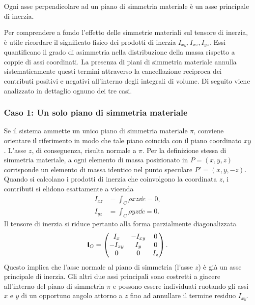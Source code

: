 \begin{proposition}
    Ogni asse perpendicolare ad un piano di simmetria materiale è un asse principale di inerzia.
\end{proposition}

Per comprendere a fondo l'effetto delle simmetrie materiali sul tensore di inerzia, è utile ricordare il significato fisico dei prodotti di inerzia $I_{xy}, I_{xz}, I_{yz}$. Essi quantificano il grado di asimmetria nella distribuzione della massa rispetto a coppie di assi coordinati. La presenza di piani di simmetria materiale annulla sistematicamente questi termini attraverso la cancellazione reciproca dei contributi positivi e negativi all'interno degli integrali di volume. Di seguito viene analizzato in dettaglio ognuno dei tre casi.

\subsubsection*{Caso 1: Un solo piano di simmetria materiale}
Se il sistema ammette un unico piano di simmetria materiale $\pi$, conviene orientare il riferimento in modo che tale piano coincida con il piano coordinato $xy$. L'asse $z$, di conseguenza, risulta normale a $\pi$. Per la definizione stessa di simmetria materiale, a ogni elemento di massa posizionato in $P=(x, y, z)$ corrisponde un elemento di massa identico nel punto speculare $P'=(x, y, -z)$. Quando si calcolano i prodotti di inerzia che coinvolgono la coordinata $z$, i contributi si elidono esattamente a vicenda
\begin{align*}
    I_{xz} &= \int_C \rho x z \dd{c} = 0, \\
    I_{yz} &= \int_C \rho y z \dd{c} = 0.
\end{align*}
Il tensore di inerzia si riduce pertanto alla forma parzialmente diagonalizzata
\begin{equation*}
    \boldsymbol{\mathsf{I}}_O = \begin{pmatrix}
        I_x & -I_{xy} & 0 \\
        -I_{xy} & I_y & 0 \\
        0 & 0 & I_z
    \end{pmatrix}.
\end{equation*}
Questo implica che l'asse normale al piano di simmetria (l'asse $z$) è già un asse principale di inerzia. Gli altri due assi principali sono costretti a giacere all'interno del piano di simmetria $\pi$ e possono essere individuati ruotando gli assi $x$ e $y$ di un opportuno angolo attorno a $z$ fino ad annullare il termine residuo $I_{xy}$.

